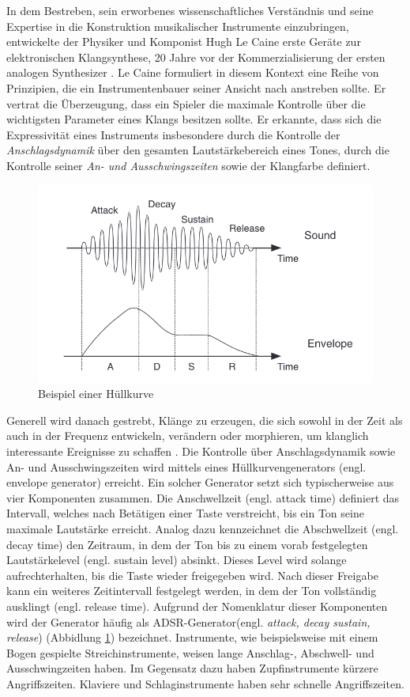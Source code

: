 \documentclass[
  a4paper,  %
  twoside,  %
  bibliography=totoc,
  headsepline,
  cleardoublepage=empty,
  parskip=half,
  draft=false
]{scrbook}
\begin{document}
In dem Bestreben, sein erworbenes wissenschaftliches Verständnis und seine Expertise in die Konstruktion musikalischer Instrumente einzubringen, entwickelte der Physiker und Komponist Hugh Le Caine erste Geräte zur elektronischen Klangsynthese, 20 Jahre vor der Kommerzialisierung der ersten analogen Synthesizer \cite{young_gale_hugh_2013}. Le Caine formuliert in diesem Kontext eine Reihe von Prinzipien, die ein Instrumentenbauer seiner Ansicht nach anstreben sollte. Er vertrat die Überzeugung, dass ein Spieler die maximale Kontrolle über die wichtigsten Parameter eines Klangs besitzen sollte. Er erkannte, dass sich die Expressivität eines Instruments insbesondere durch die Kontrolle der \emph{Anschlagsdynamik} über den gesamten Lautstärkebereich eines Tones, durch die Kontrolle seiner \emph{An- und Ausschwingszeiten} sowie der Klangfarbe definiert. \cite{ruschkowski_elektronische_2019}

\begin{figure}[h]
  \centering
  \includegraphics[width=.7\textwidth]{graphics/ADSR.png}
  \caption[ADSR]{Beispiel einer Hüllkurve \cite{russ_sound_2009}}
  \label{fig:adsr}
\end{figure}

Generell wird danach gestrebt, Klänge zu erzeugen, die sich sowohl in der Zeit als auch in der Frequenz entwickeln, verändern oder morphieren, um klanglich interessante Ereignisse zu schaffen \cite{pirkle_designing_2021}. Die Kontrolle über Anschlagsdynamik sowie An- und Ausschwingszeiten wird mittels eines Hüllkurvengenerators (engl. envelope generator) erreicht. Ein solcher Generator setzt sich typischerweise aus vier Komponenten zusammen. Die Anschwellzeit (engl. attack time) definiert das Intervall, welches nach Betätigen einer Taste verstreicht, bis ein Ton seine maximale Lautstärke erreicht. Analog dazu kennzeichnet die Abschwellzeit (engl. decay time) den Zeitraum, in dem der Ton bis zu einem vorab festgelegten Lautstärkelevel (engl. sustain level) absinkt. Dieses Level wird solange aufrechterhalten, bis die Taste wieder freigegeben wird. Nach dieser Freigabe kann ein weiteres Zeitintervall festgelegt werden, in dem der Ton vollständig ausklingt (engl. release time). Aufgrund der Nomenklatur dieser Komponenten wird der Generator häufig als ADSR-Generator(engl. \emph{attack, decay sustain, release}) (Abbidlung \ref{fig:adsr})  bezeichnet. Instrumente, wie beispielsweise mit einem Bogen gespielte Streichinstrumente, weisen lange Anschlag-, Abschwell- und Ausschwingzeiten haben. Im Gegensatz dazu haben Zupfinstrumente kürzere Angriffszeiten. Klaviere und Schlaginstrumente haben sehr schnelle Angriffszeiten. \cite{ruschkowski_elektronische_2019, russ_sound_2009}
\end{document}
